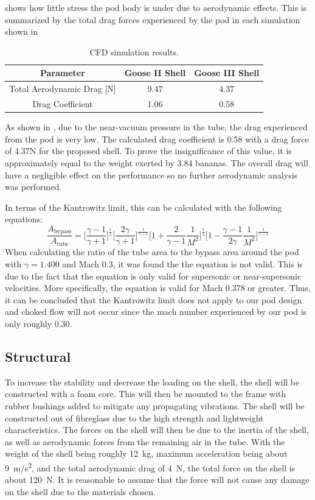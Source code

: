 \documentclass[main.tex]{subfiles}
\begin{document}
 shows how little stress the pod body is under due to aerodynamic effects. This is summarized by the total drag forces experienced by the pod in each simulation shown in 
\begin{table}[h!]
\centering
\begin{tabular}{c c c} 
\hline
Parameter & Goose II Shell & Goose III Shell \\
\hline
Total Aerodynamic Drag [N] & 9.47 & 4.37\\
Drag Coefficient & 1.06 & 0.58\\
\hline
\end{tabular}
\caption{CFD simulation results.}
\label{table:aerotable2}
\end{table}
As shown in , due to the near-vacuum pressure in the tube, the drag experienced from the pod is very low. The calculated drag coefficient is 0.58 with a drag force of 4.37N for the proposed shell. To prove the insignificance of this value, it is approximately equal to the weight exerted by 3.84 bananas. The overall drag will have a negligible effect on the performance so no further aerodynamic analysis was performed.

In terms of the Kantrowitz limit, this can be calculated with the following equations:
\begin{equation}
\frac{A_{\textrm{bypass}}}{A_{\textrm{tube}}}=\bigg[\frac{\gamma - 1}{\gamma + 1}\bigg]^{\frac{1}{2}}\bigg[\frac{2\gamma}{\gamma + 1}\bigg]^{\frac{1}{\gamma - 1}}\bigg[1 + \frac{2}{\gamma - 1}\frac{1}{M^{2}}\bigg]^{\frac{1}{2}}\bigg[1 - \frac{\gamma - 1}{2\gamma}\frac{1}{M^{2}}\bigg]^{\frac{1}{\gamma - 1}}
\end{equation}
When calculating the ratio of the tube area to the bypass area around the pod with $\gamma= 1.400$ and Mach 0.3, it was found the the equation is not valid. This is due to the fact that the equation is only valid for supersonic or near-supersonic velocities. More specifically, the equation is valid for Mach 0.378 or greater. Thus, it can be concluded that the Kantrowitz limit does not apply to our pod design and choked flow will not occur since the mach number experienced by our pod is only roughly 0.30.\\
    \subsection{Structural}
To increase the stability and decrease the loading on the shell, the shell will be constructed with a foam core. This will then be mounted to the frame with rubber bushings added to mitigate any propagating vibrations. The shell will be constructed out of fibreglass due to the high strength and lightweight characteristics. The forces on the shell will then be due to the inertia of the shell, as well as aerodynamic forces from the remaining air in the tube. With the weight of the shell being roughly \SI{12}{kg}, maximum acceleration being about \SI{9}{m/s^2}, and the total aerodynamic drag of \SI{4}{N}, the total force on the shell is about \SI{120}{N}. It is reasonable to assume that the force will not cause any damage on the shell due to the materials chosen. 
\end{document}

